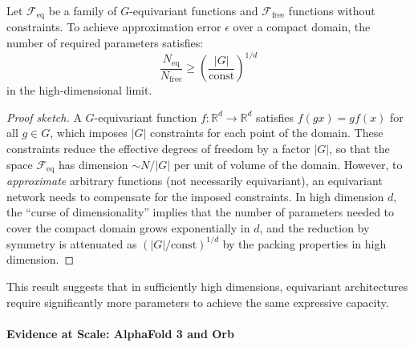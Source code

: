 \begin{proposition}
Let $\mathcal{F}_{\text{eq}}$ be a family of $G$-equivariant functions and $\mathcal{F}_{\text{free}}$ functions without constraints. To achieve approximation error $\epsilon$ over a compact domain, the number of required parameters satisfies:
\begin{equation}
\frac{N_{\text{eq}}}{N_{\text{free}}} \geq \left(\frac{|G|}{\text{const}}\right)^{1/d}
\end{equation}
in the high-dimensional limit.
\end{proposition}

\begin{proof}[Proof sketch]
A $G$-equivariant function $f: \mathbb{R}^d \to \mathbb{R}^d$ satisfies $f(gx) = gf(x)$ for all $g \in G$, which imposes $|G|$ constraints for each point of the domain. These constraints reduce the effective degrees of freedom by a factor $|G|$, so that the space $\mathcal{F}_{\text{eq}}$ has dimension $\sim N/|G|$ per unit of volume of the domain. However, to \textit{approximate} arbitrary functions (not necessarily equivariant), an equivariant network needs to compensate for the imposed constraints. In high dimension $d$, the ``curse of dimensionality'' implies that the number of parameters needed to cover the compact domain grows exponentially in $d$, and the reduction by symmetry is attenuated as $(|G|/\text{const})^{1/d}$ by the packing properties in high dimension.
\end{proof}

This result suggests that in sufficiently high dimensions, equivariant architectures require significantly more parameters to achieve the same expressive capacity.

\paragraph{Evidence at Scale: AlphaFold 3 and Orb}

